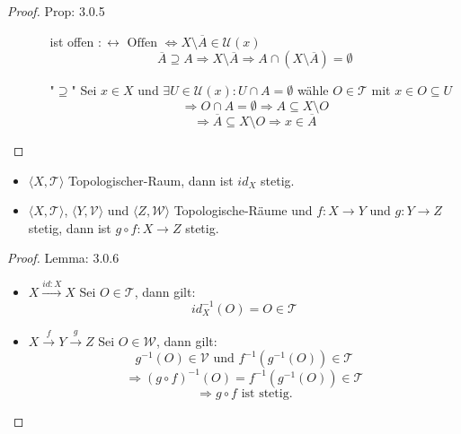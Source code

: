 \begin{proof}{Prop: 3.0.5}
\begin{enumerate}
\begin{itemize}
        ist offen $: \leftrightarrow \text{ Offen } \Leftrightarrow
        X\setminus \overline{A} \in \mathscr{U}(x)$ \\
        $$
        \overline{A} \supseteq A \Rightarrow X\setminus \overline{A} 
        \Rightarrow A \cap (X\setminus \overline{A}) = \emptyset
        $$
        \item["$\supseteq$"]
        Sei $x \in X$ und $\exists U \in \mathscr{U}(x) :U \cap A = \emptyset$ 
        wähle $O \in \mathcal{T}$ mit $x \in O \subseteq U$ \\
        $$
        \Rightarrow O \cap A = \emptyset \Rightarrow A \subseteq X \setminus O
        $$ 
        $$
        \Rightarrow \overline{A} \subseteq X \setminus O \Rightarrow x \in \overline{A}
        $$
    \end{itemize}
\end{enumerate}
\end{proof}

\mlenma{}
{
    \begin{itemize}
        \item $\langle X, \mathcal{T} \rangle$ Topologischer-Raum, dann ist $id_X$ stetig.
        \item $\langle X, \mathcal{T} \rangle$, $\langle Y, \mathcal{V} \rangle$
        und $\langle Z, \mathcal{W} \rangle$
        Topologische-Räume und $f : X \to Y$ und $g : Y \to Z$ stetig, dann ist
        $g \circ f : X \to Z$ stetig.
    \end{itemize}
}

\begin{proof}{Lemma: 3.0.6}\\
    \begin{itemize}
        \item $X \overset{id:X}{\to} X$ Sei $O \in \mathcal{T}$, dann gilt:
        $$
        id_X^{-1}(O) = O \in \mathcal{T}
        $$
        \item $X \overset{f}{\to} Y \overset{g}{\to} Z$ 
        Sei $O \in \mathcal{W}$, dann gilt:
        $$
        g^{-1}(O) \in \mathcal{V} \text{ und } f^{-1}(g^{-1}(O)) \in \mathcal{T}
        $$
        $$\Rightarrow (g \circ f)^{-1}(O) = f^{-1}(g^{-1}(O)) \in \mathcal{T}
        $$
        $$
        \Rightarrow g \circ f \text{ ist stetig.}
        $$
    \end{itemize}
\end{proof}

